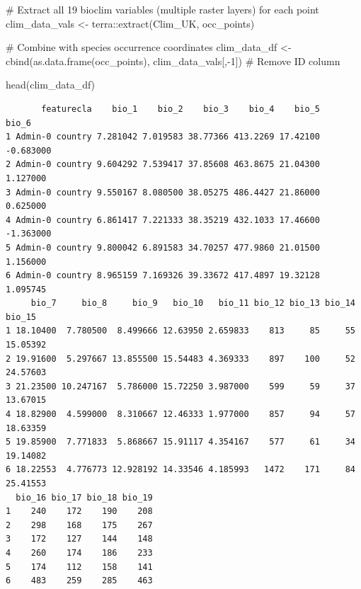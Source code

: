 \documentclass[
]{book}
\newenvironment{Shaded}{\begin{snugshade}}{\end{snugshade}}
\newcommand{\CommentTok}[1]{\textcolor[rgb]{0.37,0.37,0.37}{#1}}
\newcommand{\DecValTok}[1]{\textcolor[rgb]{0.68,0.00,0.00}{#1}}
\newcommand{\FunctionTok}[1]{\textcolor[rgb]{0.28,0.35,0.67}{#1}}
\newcommand{\NormalTok}[1]{\textcolor[rgb]{0.00,0.23,0.31}{#1}}
\newcommand{\OtherTok}[1]{\textcolor[rgb]{0.00,0.23,0.31}{#1}}
\newcommand{\SpecialCharTok}[1]{\textcolor[rgb]{0.37,0.37,0.37}{#1}}
\begin{document}
\begin{Shaded}
\begin{Highlighting}[]
\CommentTok{\# Extract all 19 bioclim variables (multiple raster layers) for each point}
\NormalTok{clim\_data\_vals }\OtherTok{\textless{}{-}}\NormalTok{ terra}\SpecialCharTok{::}\FunctionTok{extract}\NormalTok{(Clim\_UK, occ\_points)}

\CommentTok{\# Combine with species occurrence coordinates}
\NormalTok{clim\_data\_df }\OtherTok{\textless{}{-}} \FunctionTok{cbind}\NormalTok{(}\FunctionTok{as.data.frame}\NormalTok{(occ\_points), clim\_data\_vals[,}\SpecialCharTok{{-}}\DecValTok{1}\NormalTok{])  }\CommentTok{\# Remove ID column}

\FunctionTok{head}\NormalTok{(clim\_data\_df)}
\end{Highlighting}
\end{Shaded}

\begin{verbatim}
       featurecla    bio_1    bio_2    bio_3    bio_4    bio_5     bio_6
1 Admin-0 country 7.281042 7.019583 38.77366 413.2269 17.42100 -0.683000
2 Admin-0 country 9.604292 7.539417 37.85608 463.8675 21.04300  1.127000
3 Admin-0 country 9.550167 8.080500 38.05275 486.4427 21.86000  0.625000
4 Admin-0 country 6.861417 7.221333 38.35219 432.1033 17.46600 -1.363000
5 Admin-0 country 9.800042 6.891583 34.70257 477.9860 21.01500  1.156000
6 Admin-0 country 8.965159 7.169326 39.33672 417.4897 19.32128  1.095745
     bio_7     bio_8     bio_9   bio_10   bio_11 bio_12 bio_13 bio_14   bio_15
1 18.10400  7.780500  8.499666 12.63950 2.659833    813     85     55 15.05392
2 19.91600  5.297667 13.855500 15.54483 4.369333    897    100     52 24.57603
3 21.23500 10.247167  5.786000 15.72250 3.987000    599     59     37 13.67015
4 18.82900  4.599000  8.310667 12.46333 1.977000    857     94     57 18.63359
5 19.85900  7.771833  5.868667 15.91117 4.354167    577     61     34 19.14082
6 18.22553  4.776773 12.928192 14.33546 4.185993   1472    171     84 25.41553
  bio_16 bio_17 bio_18 bio_19
1    240    172    190    208
2    298    168    175    267
3    172    127    144    148
4    260    174    186    233
5    174    112    158    141
6    483    259    285    463
\end{verbatim}
\end{document}
